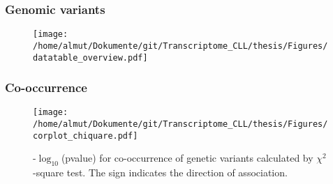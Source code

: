 \documentclass[xcolor=dvipsnames,t,10pt]{beamer}
\begin{document}
%
%
%
\begin{frame}[c]
	\frametitle{Genomic variants}
	\begin{figure}
		\centering
		\texttt{[image: /home/almut/Dokumente/git/Transcriptome\_CLL/thesis/Figures/datatable\_overview.pdf]}
	\end{figure}
\end{frame}
%
%
\begin{frame}[c]
	\frametitle{Co-occurrence}
	\begin{figure}
		\centering
		\texttt{[image: /home/almut/Dokumente/git/Transcriptome\_CLL/thesis/Figures/corplot\_chiquare.pdf]}
		\caption{-$\log_{10}$(pvalue) for co-occurrence of genetic variants calculated by $\chi^2$-square test. The sign indicates the direction of association.}
	\end{figure}
\end{frame}
%
%
%
\end{document}
